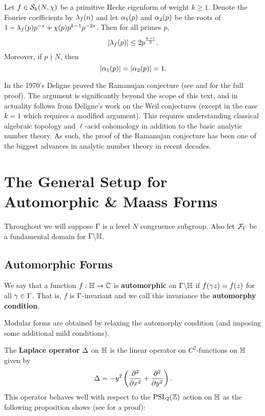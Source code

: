       \begin{theorem}
        Let $f \in \mathcal{S}_{k}(N,\chi)$ be a primitive Hecke eigenform of weight $k \ge 1$. Denote the Fourier coefficients by $\lambda_{f}(n)$ and let $\alpha_{1}(p)$ and $\alpha_{2}(p)$ be the roots of $1-\lambda_{f}(p)p^{-s}+\chi(p)p^{k-1}p^{-2s}$. Then for all primes $p$,
        \[
          |\lambda_{f}(p)| \le 2p^{\frac{k-1}{2}}.
        \]
        Moreover, if $p \nmid N$, then
        \[
          |\alpha_{1}(p)| = |\alpha_{2}(p)| = 1.
        \]
      \end{theorem}

      In the 1970's Deligne proved the Ramanujan conjecture (see \cite{deligne1971formes} and \cite{deligne1974conjecture} for the full proof). The argument is significantly beyond the scope of this text, and in actuality follows from Deligne's work on the Weil conjectures (except in the case $k = 1$ which requires a modified argument). This requires understanding classical algebraic topology and $\ell$-acid cohomology in addition to the basic analytic number theory. As such, the proof of the Ramanujan conjecture has been one of the biggest advances in analytic number theory in recent decades.
  \section{The General Setup for Automorphic \& Maass Forms}
    Throughout we will suppose $\Gamma$ is a level $N$ congruence subgroup. Also let $\mathcal{F}_{\Gamma}$ be a fundamental domain for $\Gamma\backslash\mathbb{H}$.
    \subsection*{Automorphic Forms}
      We say that a function $f:\mathbb{H} \to \mathbb{C}$ is \textbf{automorphic} on $\Gamma\backslash\mathbb{H}$ if $f(\gamma z) = f(z)$ for all $\gamma \in \Gamma$. That is, $f$ is $\Gamma$-invariant and we call this invariance the \textbf{automorphy condition}.

      \begin{remark}
        Modular forms are obtained by relaxing the automorphy condition (and imposing some additional mild conditions).
      \end{remark}
      
      The \textbf{Laplace operator} $\Delta$ on $\mathbb{H}$ is the linear operator on $C^{2}$-functions on $\mathbb{H}$ given by
      \[
        \Delta = -y^{2}\left(\frac{\partial^{2}}{\partial x^{2}}+\frac{\partial^{2}}{\partial y^{2}}\right).
      \]
      This operator behaves well with respect to the $\mathrm{PSL}_{2}(\mathbb{Z})$ action on $\mathbb{H}$ as the following proposition shows (see \cite{motohashi1997spectral} for a proof):

